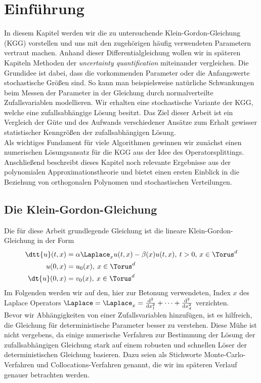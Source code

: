 
\chapter{Einführung}
In diesem Kapitel werden wir die zu untersuchende Klein-Gordon-Gleichung (KGG) vorstellen und uns mit den zugehörigen häufig verwendeten Parametern vertraut machen. Anhand dieser Differentialgleichung wollen wir in späteren Kapiteln Methoden der \emph{uncertainty quantification} miteinander vergleichen. Die Grundidee ist dabei, dass die vorkommenden Parameter oder die Anfangswerte stochastische Größen sind. So kann man beispielsweise natürliche Schwankungen beim Messen der Parameter in der Gleichung durch normalverteilte Zufallsvariablen modellieren. Wir erhalten eine stochastische Variante der KGG, welche eine zufallsabhängige Lösung besitzt. Das Ziel dieser Arbeit ist ein Vergleich der Güte und des Aufwands verschiedener Ansätze zum Erhalt gewisser statistischer Kenngrößen der zufallsabhängigen Lösung.\\
Als wichtiges Fundament für viele Algorithmen gewinnen wir zunächst einen numerischen Lösungsansatz für die KGG aus der Idee des Operatorsplittings. Anschließend beschreibt dieses Kapitel noch relevante Ergebnisse aus der polynomialen Approximationstheorie und bietet einen ersten Einblick in die Beziehung von orthogonalen Polynomen und stochastischen Verteilungen.
\label{Chapter1}

\section{Die Klein-Gordon-Gleichung}
Die für diese Arbeit grundlegende Gleichung ist die lineare Klein-Gordon-Gleichung in der Form
\begin{align}
\label{kgg}
\dtt{u}(t,x)&=\alpha \Laplace_x u(t,x) - \beta(x)u(t,x), \: t>0, \, x\in \Torus^d\\
u(0,x)&=u_0(x), \: x\in \Torus^d\\
\dt{u}(0,x)&=v_0(x), \: x\in \Torus^d
\end{align}
Im Folgenden werden wir auf den, hier zur Betonung verwendeten, Index $x$ des Laplace Operators $\Laplace=\Laplace_x=\frac{\text{d}^2}{\text{d}x^2_1}+\dots+\frac{\text{d}^2}{\text{d}x^2_d}$ verzichten.\\
Bevor wir Abhängigkeiten von einer Zufallsvariablen hinzufügen, ist es hilfreich, die Gleichung für deterministische Parameter besser zu verstehen. Diese Mühe ist nicht vergebens, da einige numerische Verfahren zur Bestimmung der Lösung der zufallsabhängigen Gleichung stark auf einem robusten und schnellen Löser der deterministischen Gleichung basieren. Dazu seien als Stichworte Monte-Carlo-Verfahren und Collocations-Verfahren genannt, die wir im späteren Verlauf genauer betrachten werden.
